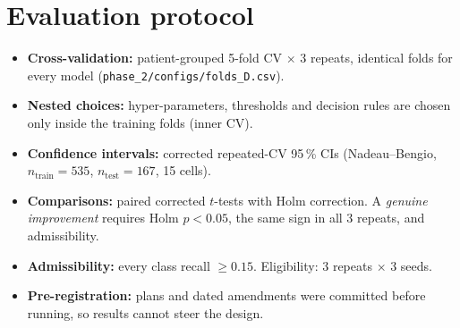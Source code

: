 \section{Evaluation protocol}\label{sec:protocol}
\begin{itemize}
  \item \textbf{Cross-validation:} patient-grouped 5-fold CV $\times$ 3 repeats, identical folds for every model
    (\texttt{phase\_2/configs/folds\_D.csv}).
  \item \textbf{Nested choices:} hyper-parameters, thresholds and decision rules are chosen only inside the training
    folds (inner CV).
  \item \textbf{Confidence intervals:} corrected repeated-CV 95\,\% CIs (Nadeau--Bengio,
    $n_{\text{train}}=535$, $n_{\text{test}}=167$, 15 cells).
  \item \textbf{Comparisons:} paired corrected $t$-tests with Holm correction. A \emph{genuine improvement} requires
    Holm $p<0.05$, the same sign in all 3 repeats, and admissibility.
  \item \textbf{Admissibility:} every class recall $\ge 0.15$. Eligibility: 3 repeats $\times$ 3 seeds.
  \item \textbf{Pre-registration:} plans and dated amendments were committed before running, so results cannot steer
    the design.
\end{itemize}
